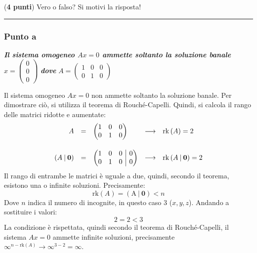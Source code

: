 \documentclass[a4paper]{article}
\makeatletter
\newcommand{\longline}{\noindent\rule{\textwidth}{0.4pt}}
\newenvironment{rowequmat}[1]{\left(\array{@{}#1@{}}}{\endarray\right)}
\makeatother
\begin{document}
	(\textbf{4 punti}) Vero o falso? Si motivi la risposta!

	\longline

	\subsubsection{Punto a}

	\textcolor{Green4}{\textbf{\emph{Il sistema omogeneo $Ax = 0$ ammette soltanto la soluzione banale}} $x = \begin{pmatrix}
		0 \\ 0 \\ 0
	\end{pmatrix}$ \textbf{\emph{dove}} $A = \begin{pmatrix}
		1 & 0 & 0 \\ 0 & 1 & 0
	\end{pmatrix}$}\newline

	\noindent
	Il sistema omogeneo $Ax = 0$ non ammette soltanto la soluzione banale. Per dimostrare ciò, si utilizza il teorema di Rouché-Capelli. Quindi, si calcola il rango delle matrici ridotte e aumentate:
	\begin{equation*}
		\begin{array}{rllll}
			A &=& \begin{pmatrix}
				1 & 0 & 0 \\ 0 & 1 & 0
			\end{pmatrix} &\longrightarrow& \mathrm{rk}\left(A\right) = 2 \\ [2em]
			\left(A \: | \: \mathbf{0}\right) &=& \begin{rowequmat}{ccc|c}
				1 & 0 & 0 & 0 \\
				0 & 1 & 0 & 0
			\end{rowequmat} &\longrightarrow& \mathrm{rk}\left(A \: | \: \mathbf{0}\right) = 2
		\end{array}
	\end{equation*}
	Il rango di entrambe le matrici è uguale a due, quindi, secondo il teorema, esistono una o infinite soluzioni. Precisamente:
	\begin{equation*}
		\mathrm{rk}\left(A\right) = \mathrm{\left(A \: | \: \mathbf{0}\right)} < n
	\end{equation*}
	Dove $n$ indica il numero di incognite, in questo caso 3 ($x,y,z$). Andando a sostituire i valori:
	\begin{equation*}
		2 = 2 < 3
	\end{equation*}
	La condizione è rispettata, quindi secondo il teorema di Rouché-Capelli, il sistema $Ax = 0$ ammette infinite soluzioni, precisamente $\infty^{n - \mathrm{rk}\left(A\right)} \rightarrow \infty^{3-2} = \infty$.
	
\end{document}
